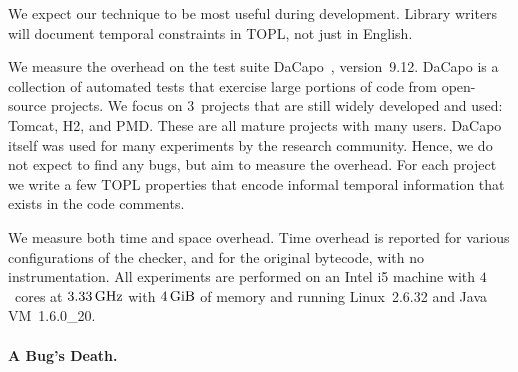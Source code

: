 \documentclass[9pt, preprint]{sigplanconf} %
\theoremstyle{definition}
\theoremstyle{remark}
\begin{document}

We expect our technique to be most useful during development.
Library writers will document temporal constraints in TOPL, not just in English.

We measure the overhead on the test suite DaCapo~\cite{dblp:conf/oopsla/dacapo}, version~9.12.
DaCapo is a collection of automated tests that exercise large portions of code from open-source projects.
We focus on $3$~projects that are still widely developed and used: Tomcat, H2, and PMD\null.
These are all mature projects with many users.
DaCapo itself was used for many experiments by the research community.
Hence, we do not expect to find any bugs, but aim to measure the overhead.
For each project we write a few TOPL properties that encode informal temporal information that exists in the code comments.

We measure both time and space overhead.
Time overhead is reported  for various configurations of the checker, and  for the original bytecode, with no instrumentation.
%
All experiments are performed on an Intel i5 machine with $4$~cores at $3.33\rm\,GHz$ with  $4\rm\,GiB$ of memory and 
running Linux~2.6.32 and Java VM~1.6.0\_20.


\paragraph{A Bug's Death.} %
\end{document}
